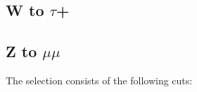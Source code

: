 


\subsection{W to \texorpdfstring{$\tau$+\MET}{tau+MET}}




\subsection{Z to \texorpdfstring{$\mu\mu$}{mumu}}

The selection consists of the following cuts:
